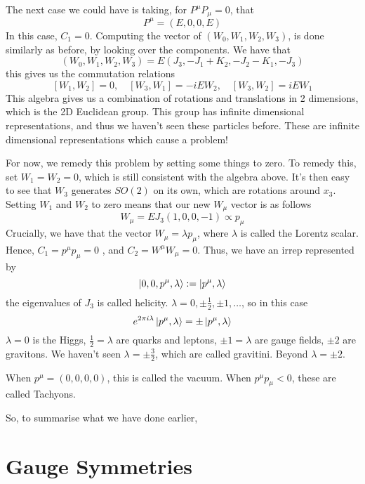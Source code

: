 \documentclass[11pt, oneside]{article}   	%
\theoremstyle{slanted}
\begin{document}
The next case we could have 
is taking, for $ P ^ \mu P _ \mu  =0   $, 
that 
\[
 P ^ \mu  = \left( E , 0 , 0 , E  \right)
\] In this case, $ C _  1 =0 $. 
Computing the vector of $ \left( W_ 0 , W _1 , W _ 2, W_  3  \right)  $,
is done similarly as before, by 
looking over the components. 
We have that 
\[
	\left( W_0, W_1 , W_2, W_3  \right)   = E \left( 
	J _ 3,  - J _1 + K _ 2 ,  - J _ 2  -  K_ 1 ,  -J _ 3 \right) 
\] this gives us the commutation 
relations 
\[
 \left[  W_1 , W _ 2   \right]  =0 , \quad \left[  W _ 3,  W_ 1  \right]  
  =  - i E W _2 , \quad \left[  W _ 3, W _ 2  \right]   = i E W_ 1 
\] This algebra gives us a combination 
of rotations and translations in 2 dimensions, 
which is the 2D Euclidean group. 
This group has
infinite dimensional representations, and thus 
we haven't seen these particles 
before. These are infinite dimensional representations 
which cause a problem! 

For now, we remedy this 
problem by setting some things to zero. 
To remedy this, set $ W_ 1  = W_ 2 = 0 $, which 
is still consistent with the algebra above. 
It's then easy to see that 
$ W _ 3   $ generates $ SO ( 2 ) $ on its 
own, which are rotations around $ x _ 3 $. 
Setting $ W_1 $ and $ W_2 $ to zero 
means that our new $ W _ \mu $ vector is 
as follows 
\[
 W_ \mu  = E J _ 3 \left( 1, 0 , 0 , - 1   \right)  \propto p _ \mu 
\] Crucially, 
we have that the vector $ W _ \mu = \lambda p _ \mu $, 
where $ \lambda $ is called the Lorentz scalar. Hence, $ C _ 1 = p ^ \mu p _ \mu  =  0$ , 
and $ C _ 2  =  W^ \mu W _ \mu  = 0 $. 
Thus, we have an irrep represented by 
\[
 \ket{ 0 , 0 , p ^ \mu , \lambda } : = \ket{ p ^ \mu , \lambda } 
\] the eigenvalues of $ J _  3 $ is called helicity. 
$ \lambda  = 0 , \pm \frac{1}{2 } , \pm 1 , \dots $, 
so in this case
\[
 e ^{  2 \pi i \lambda  } \ket{ p ^ \mu , \lambda }  = \pm \ket{ p^ \mu , \lambda } 
\] $ \lambda  = 0 $ is the Higgs, 
$ \frac{1}{2 }  = \lambda $ are quarks and leptons, 
$ \pm 1  = \lambda $ are gauge fields, 
$ \pm  2  $ are gravitons. 
We haven't seen $ \lambda  = \pm \frac{3}{2 } $, 
which are called gravitini. 
Beyond $ \lambda  = \pm 2 $. 

When $ p ^ \mu  = \left( 0 , 0 , 0 , 0  \right)  $, 
this is called the vacuum. When $ p ^ \mu p _ \mu < 0  $, 
these are called Tachyons. 

So, to summarise what we have done earlier, 

\section{Gauge Symmetries}%
\label{sec:gauge_symmetries}
\end{document}
